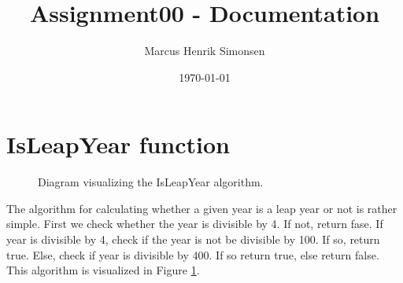 \documentclass{article}
\title{Assignment00 - Documentation}
\author{Marcus Henrik Simonsen}
\date{\today}
\begin{document}
\maketitle

\section{IsLeapYear function}

\begin{figure}[H]
\centering

\caption{Diagram visualizing the IsLeapYear algorithm.}
\label{fig:IsLeapYear_algorithm}
\end{figure}

The algorithm for calculating whether a given year is a leap year or not is rather simple. First we check whether the year is divisible by 4. If not, return fase. If year is divisible by 4, check if the year is not be divisible by 100. If so, return true. Else, check if year is
divisible by 400. If so return true, else return false. This algorithm is visualized in Figure \ref{fig:IsLeapYear_algorithm}.
\end{document}
